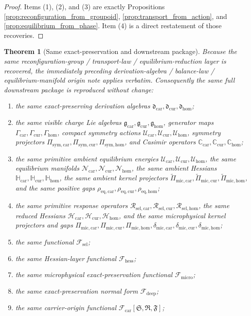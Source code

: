 \documentclass[11pt]{article}
\newcommand{\CarrierFunctional}{\mathscr F_{\mathrm{car}}}
\newcommand{\DeepFunctional}{\mathscr F_{\mathrm{deep}}}
\newcommand{\UltraFunctional}{\mathscr F_{\mathrm{micro}}}
\newcommand{\RootFunctional}{\mathscr F_{\mathrm{hess}}}
\newcommand{\StemFunctional}{\mathscr F_{\mathrm{sel}}}
\newcommand{\CarrierSeed}{\mathfrak S}
\newcommand{\RelabelSeed}{\mathfrak R}
\newcommand{\FreeSeed}{\mathfrak F}
\newcommand{\UltraCarProj}{\Pi_{\mathrm{mic,car}}}
\newcommand{\UltraCurProj}{\Pi_{\mathrm{mic,cur}}}
\newcommand{\UltraHomProj}{\Pi_{\mathrm{mic,hom}}}
\newcommand{\UltraCarGap}{\delta_{\mathrm{mic,car}}}
\newcommand{\UltraCurGap}{\delta_{\mathrm{mic,cur}}}
\newcommand{\UltraHomGap}{\delta_{\mathrm{mic,hom}}}
\newcommand{\TensorSymProj}{\Pi_{\mathrm{sym,car}}}
\newcommand{\CurSymProj}{\Pi_{\mathrm{sym,cur}}}
\newcommand{\HomSymProj}{\Pi_{\mathrm{sym,hom}}}
\newcommand{\TensorHess}{\mathcal H_{\mathrm{car}}}
\newcommand{\CurHess}{\mathcal H_{\mathrm{cur}}}
\newcommand{\HomHess}{\mathcal H_{\mathrm{hom}}}
\newcommand{\TensorSymAct}{\mathscr U_{\mathrm{car}}}
\newcommand{\CurSymAct}{\mathscr U_{\mathrm{cur}}}
\newcommand{\HomSymAct}{\mathscr U_{\mathrm{hom}}}
\newcommand{\TensorResp}{\mathcal R_{\mathrm{sel,car}}}
\newcommand{\CurResp}{\mathcal R_{\mathrm{sel,cur}}}
\newcommand{\HomResp}{\mathcal R_{\mathrm{sel,hom}}}
\newcommand{\TensorChargeAlg}{\mathfrak g_{\mathrm{car}}}
\newcommand{\CurChargeAlg}{\mathfrak g_{\mathrm{cur}}}
\newcommand{\HomChargeAlg}{\mathfrak g_{\mathrm{hom}}}
\newcommand{\TensorGen}{\Gamma_{\mathrm{car}}}
\newcommand{\CurGen}{\Gamma_{\mathrm{cur}}}
\newcommand{\HomGen}{\Gamma_{\mathrm{hom}}}
\newcommand{\TensorCasimir}{\mathbb C_{\mathrm{car}}}
\newcommand{\CurCasimir}{\mathbb C_{\mathrm{cur}}}
\newcommand{\HomCasimir}{\mathbb C_{\mathrm{hom}}}
\newcommand{\TensorAmbientHess}{\mathbb H_{\mathrm{car}}}
\newcommand{\CurAmbientHess}{\mathbb H_{\mathrm{cur}}}
\newcommand{\HomAmbientHess}{\mathbb H_{\mathrm{hom}}}
\newcommand{\TensorEqKerProj}{\widetilde\Pi_{\mathrm{mic,car}}}
\newcommand{\CurEqKerProj}{\widetilde\Pi_{\mathrm{mic,cur}}}
\newcommand{\HomEqKerProj}{\widetilde\Pi_{\mathrm{mic,hom}}}
\newcommand{\EqCarGap}{\rho_{\mathrm{eq,car}}}
\newcommand{\EqCurGap}{\rho_{\mathrm{eq,cur}}}
\newcommand{\EqHomGap}{\rho_{\mathrm{eq,hom}}}
\newcommand{\TensorDerAlg}{\mathfrak d_{\mathrm{car}}}
\newcommand{\CurDerAlg}{\mathfrak d_{\mathrm{cur}}}
\newcommand{\HomDerAlg}{\mathfrak d_{\mathrm{hom}}}
\newcommand{\TensorAmbientEnergy}{\mathcal U_{\mathrm{car}}}
\newcommand{\CurAmbientEnergy}{\mathcal U_{\mathrm{cur}}}
\newcommand{\HomAmbientEnergy}{\mathcal U_{\mathrm{hom}}}
\newcommand{\TensorEqManifold}{\mathcal N_{\mathrm{car}}}
\newcommand{\CurEqManifold}{\mathcal N_{\mathrm{cur}}}
\newcommand{\HomEqManifold}{\mathcal N_{\mathrm{hom}}}
\newtheorem{theorem}{Theorem}
\begin{document}
\begin{proof}
Items (1), (2), and (3) are exactly Propositions \ref{prop:reconfiguration_from_groupoid}, \ref{prop:transport_from_action}, and \ref{prop:equilibrium_from_phase}. Item (4) is a direct restatement of those recoveries.
\end{proof}

\begin{theorem}[Same exact-preservation and downstream package]
\label{thm:same_package}
Because the same reconfiguration-group / transport-law / equilibrium-reduction layer is recovered, the immediately preceding derivation-algebra / balance-law / equilibrium-manifold origin note applies verbatim. Consequently the same full downstream package is reproduced without change:
\begin{enumerate}
    \item the same exact-preserving derivation algebras \(\TensorDerAlg,\CurDerAlg,\HomDerAlg\);
    \item the same visible charge Lie algebras \(\TensorChargeAlg,\CurChargeAlg,\HomChargeAlg\), generator maps \(\TensorGen,\CurGen,\HomGen\), compact symmetry actions \(\TensorSymAct,\CurSymAct,\HomSymAct\), symmetry projectors \(\TensorSymProj,\CurSymProj,\HomSymProj\), and Casimir operators \(\TensorCasimir,\CurCasimir,\HomCasimir\);
    \item the same primitive ambient equilibrium energies \(\TensorAmbientEnergy,\CurAmbientEnergy,\HomAmbientEnergy\), the same equilibrium manifolds \(\TensorEqManifold,\CurEqManifold,\HomEqManifold\), the same ambient Hessians \(\TensorAmbientHess,\CurAmbientHess,\HomAmbientHess\), the same ambient kernel projectors \(\TensorEqKerProj,\CurEqKerProj,\HomEqKerProj\), and the same positive gaps \(\EqCarGap,\EqCurGap,\EqHomGap\);
    \item the same primitive response operators \(\TensorResp,\CurResp,\HomResp\), the same reduced Hessians \(\TensorHess,\CurHess,\HomHess\), and the same microphysical kernel projectors and gaps \(\UltraCarProj,\UltraCurProj,\UltraHomProj,\UltraCarGap,\UltraCurGap,\UltraHomGap\);
    \item the same functional \(\StemFunctional\);
    \item the same Hessian-layer functional \(\RootFunctional\);
    \item the same microphysical exact-preservation functional \(\UltraFunctional\);
    \item the same exact-preservation normal form \(\DeepFunctional\);
    \item the same carrier-origin functional \(\CarrierFunctional[\CarrierSeed,\RelabelSeed,\FreeSeed]\);

\end{enumerate}
\end{theorem}
\end{document}
